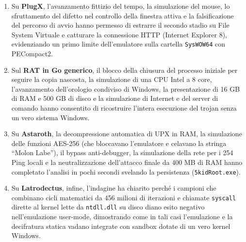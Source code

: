 \documentclass[11pt, a4paper]{article}
\begin{document}
	\begin{enumerate}
		\item Su \textbf{PlugX}, l'avanzamento fittizio del tempo, la simulazione del mouse, lo sfruttamento del difetto nel controllo della finestra attiva e la falsificazione del percorso di avvio hanno permesso di estrarre il secondo stadio su File System Virtuale e catturare la connessione HTTP (Internet Explorer 8), evidenziando un primo limite dell'emulatore sulla cartella \texttt{SysWOW64} con PECompact2.
		
		\item Sul \textbf{RAT in Go generico}, il blocco della chiusura del processo iniziale per seguire la copia nascosta, la simulazione di una CPU Intel a 8 core, l'avanzamento dell'orologio condiviso di Windows, la presentazione di 16 GB di RAM e 500 GB di disco e la simulazione di Internet e del server di comando hanno consentito di ricostruire l'intera esecuzione del trojan senza un vero sistema Windows.
		
		\item Su \textbf{Astaroth}, la decompressione automatica di UPX in RAM, la simulazione delle funzioni AES-256 (che bloccavano l'emulatore e celavano la stringa ``Molon Labe''), il bypass anti-debugger, la simulazione della rete per i 254 Ping locali e la neutralizzazione dell'attacco finale da 400 MB di RAM hanno completato l'analisi in pochi secondi svelando la persistenza (\texttt{5kidRoot.exe}).
		
		\item Su \textbf{Latrodectus}, infine, l'indagine ha chiarito perché i campioni che combinano cicli matematici da 456 milioni di iterazioni e chiamate \texttt{syscall} dirette al kernel lette da \texttt{ntdll.dll} su disco diano esito negativo nell'emulazione user-mode, dimostrando come in tali casi l'emulazione e la decifratura statica vadano integrate con sandbox dotate di un vero kernel Windows.
	\end{enumerate}
	
\end{document}
